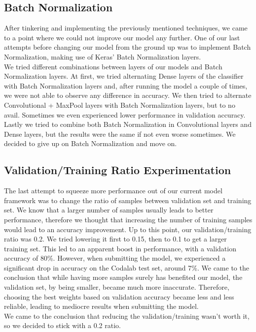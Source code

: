 \documentclass[11pt]{report}
\begin{document}
\subsection{Batch Normalization}
After tinkering and implementing the previously mentioned techniques, we came to a point where we could not improve our model any further. One of our last attempts before changing our model from the ground up was to implement Batch Normalization, making use of Keras' Batch Normalization layers. \\
We tried different combinations between layers of our models and Batch Normalization layers. At first, we tried alternating Dense layers of the classifier with Batch Normalization layers and, after running the model a couple of times, we were not able to observe any difference in accuracy. We then tried to alternate Convolutional + MaxPool layers with Batch Normalization layers, but to no avail. Sometimes we even experienced lower performance in validation accuracy. Lastly we tried to combine both Batch Normalization in Convolutional layers and Dense layers, but the results were the same if not even worse sometimes. We decided to give up on Batch Normalization and move on.

\subsection{Validation/Training Ratio Experimentation}
The last attempt to squeeze more performance out of our current model framework was to change the ratio of samples between validation set and training set. We know that a larger number of samples usually leads to better performance, therefore we thought that increasing the number of training samples would lead to an accuracy improvement. Up to this point, our validation/training ratio was 0.2. We tried lowering it first to 0.15, then to 0.1 to get a larger training set. This led to an apparent boost in performance, with a validation accuracy of 80\%. However, when submitting the model, we experienced a significant drop in accuracy on the Codalab test set, around 7\%. We came to the conclusion that while having more samples surely has benefited our model, the validation set, by being smaller, became much more inaccurate. Therefore, choosing the best weights based on validation accuracy became less and less reliable, leading to mediocre results when submitting the model. \\
We came to the conclusion that reducing the validation/training wasn't worth it, so we decided to stick with a 0.2 ratio.
\end{document}
